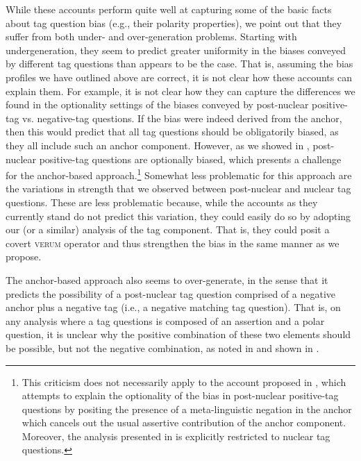\documentclass[output=paper,colorlinks,citecolor=brown]{langscibook}
\begin{document}
While these accounts perform quite well at capturing some of the basic facts about tag question bias (e.g., their polarity properties), we point out that they suffer from both under- and over-generation problems. Starting with undergeneration, they seem to predict greater uniformity in the biases conveyed by different tag questions than appears to be the case. That is, assuming the bias profiles we have outlined above are correct, it is not clear how these accounts can explain them. For example, it is not clear how they can capture the differences we found in the optionality settings of the biases conveyed by post-nuclear positive-tag vs. negative-tag questions. If the bias were indeed derived from the anchor, then this would predict that all tag questions should be obligatorily biased, as they all include such an anchor component. However, as we showed in , post-nuclear positive-tag questions are optionally biased, which presents a challenge for the anchor-based approach.\footnote{This criticism does not necessarily apply to the account proposed in \citet{Reese2009}, which attempts to explain the optionality of the bias in post-nuclear positive-tag questions by positing the presence of a meta-linguistic negation in the anchor which cancels out the usual assertive contribution of the anchor component. Moreover, the analysis presented in \citet{Jamieson2018} is explicitly restricted to nuclear tag questions.}  Somewhat less problematic for this approach are the variations in strength that we observed between post-nuclear and nuclear tag questions. These are less problematic because, while the accounts as they currently stand do not predict this variation, they could easily do so by adopting our (or a similar) analysis of the tag component. That is, they could posit a covert \textsc{verum} operator and thus strengthen the bias in the same manner as we propose. 

The anchor-based approach also seems to over-generate, in the sense that it predicts the possibility of a post-nuclear tag question comprised of a negative anchor plus a negative tag (i.e., a negative matching tag question). That is, on any analysis where a tag questions is composed of an assertion and a polar question, it is unclear why the positive combination of these two elements should be possible, but not the negative combination, as noted in \citet{Cattell1973} and shown in .  

\label{Pos.Pnu.PosAnch}
\label{Neg.Pnu.NegAnch}
\z
\end{document}
